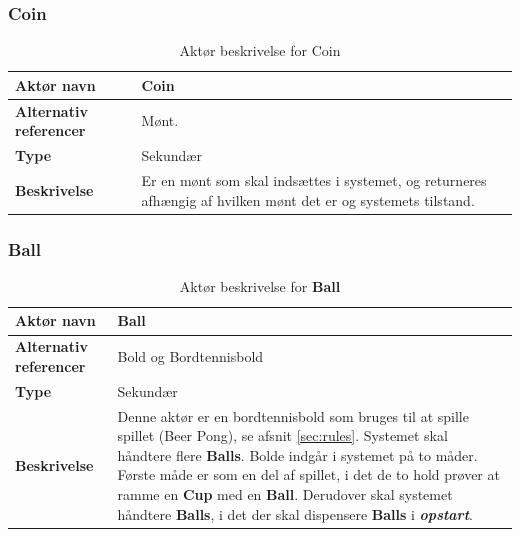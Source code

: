\documentclass[Kravspecifikation/Kravspec_Main.tex]{subfiles}
\begin{document}
\subsubsection{Coin}
\begin{table}[H]
    \centering
    \begin{tabular}{|L{0.35\textwidth}|L{0.65\textwidth}|}
        \hline
        \textbf{Aktør navn} & Coin \\ \hline
        \textbf{Alternativ referencer} & Mønt. \\ \hline
        \textbf{Type} &  Sekundær \\ \hline
        \textbf{Beskrivelse} & Er en mønt som skal indsættes i systemet, og returneres afhængig af hvilken mønt det er og systemets tilstand. \\ \hline
    \end{tabular}
    \caption{Aktør beskrivelse for Coin}
    \label{tab:CoinBeskrivelse}
\end{table}

\subsubsection{Ball}
\begin{table}[H]
    \centering
    \begin{tabular}{|L{0.35\textwidth}|L{0.65\textwidth}|}
        \hline
        \textbf{Aktør navn} & Ball \\ \hline
        \textbf{Alternativ referencer} & Bold og Bordtennisbold \\ \hline
        \textbf{Type} & Sekundær \\ \hline
        \textbf{Beskrivelse} & Denne aktør er en bordtennisbold som bruges til at spille spillet (Beer Pong), se afsnit \ref{sec:rules}. Systemet skal håndtere flere \textbf{Balls}. Bolde indgår i systemet på to måder. Første måde er som en del af spillet, i det de to hold prøver at ramme en \textbf{Cup} med en \textbf{Ball}. Derudover skal systemet håndtere \textbf{Balls}, i det der skal dispensere \textbf{Balls} i \textbf{\textit{opstart}}.\\ \hline
    \end{tabular}
    \caption{Aktør beskrivelse for \textbf{Ball}}
    \label{tab:BallBeskrivelse}
\end{table}
\end{document}

